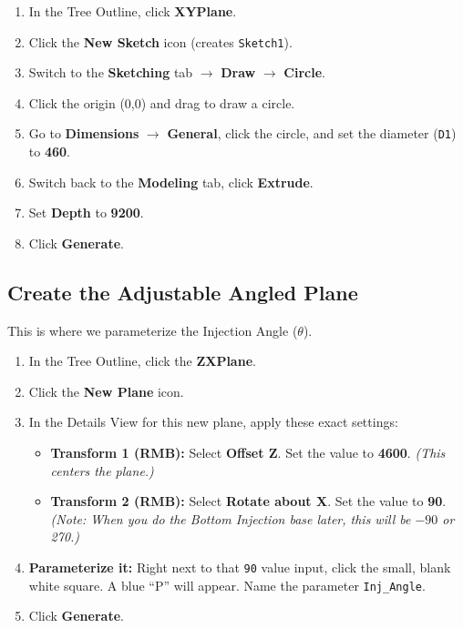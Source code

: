 \documentclass[12pt,a4paper]{report}
\begin{document}
\begin{enumerate}
  \item In the Tree Outline, click \textbf{XYPlane}.
  \item Click the \textbf{New Sketch} icon (creates \texttt{Sketch1}).
  \item Switch to the \textbf{Sketching} tab $\rightarrow$ \textbf{Draw} $\rightarrow$ \textbf{Circle}.
  \item Click the origin (0,0) and drag to draw a circle.
  \item Go to \textbf{Dimensions} $\rightarrow$ \textbf{General}, click the circle, and set the diameter (\texttt{D1}) to \textbf{460}.
  \item Switch back to the \textbf{Modeling} tab, click \textbf{Extrude}.
  \item Set \textbf{Depth} to \textbf{9200}.
  \item Click \textbf{Generate}.
\end{enumerate}

\subsection{Create the Adjustable Angled Plane}

This is where we parameterize the Injection Angle ($\theta$).

\begin{enumerate}
  \item In the Tree Outline, click the \textbf{ZXPlane}.
  \item Click the \textbf{New Plane} icon.
  \item In the Details View for this new plane, apply these exact settings:
  \begin{itemize}
    \item \textbf{Transform 1 (RMB):} Select \textbf{Offset Z}. Set the value to \textbf{4600}. \textit{(This centers the plane.)}
    \item \textbf{Transform 2 (RMB):} Select \textbf{Rotate about X}. Set the value to \textbf{90\textdegree}. \textit{(Note: When you do the Bottom Injection base later, this will be $-90$\textdegree{} or 270\textdegree{}.)}
  \end{itemize}
  \item \textbf{Parameterize it:} Right next to that \texttt{90\textdegree} value input, click the small, blank white square. A blue ``P'' will appear. Name the parameter \texttt{Inj\_Angle}.
  \item Click \textbf{Generate}.
\end{enumerate}
\end{document}
